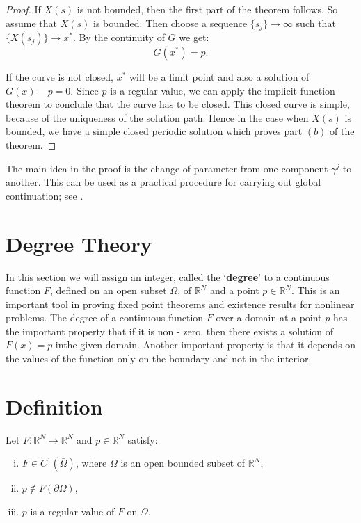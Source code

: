 \begin{proof}
If $X(s)$ is not bounded, then the first part of the theorem
follows. So assume that $X(s)$ is bounded. Then choose a sequence $\{
s_j \} \rightarrow \infty$ such that $\{ X(s_j) \} \rightarrow
x^*$. By the continuity of $G$ we get: 
$$
G(x^*) = p.
$$

If the curve is not closed, $x^*$ will be a limit point and also a
solution of $G(x)-p = 0$. Since $p$ is a regular value, we can apply
the implicit function theorem to conclude that the curve has to be
closed. This closed curve is simple, because of the uniqueness of the
solution path. Hence in the case when $X(s)$ is bounded, we have a
simple closed periodic solution which proves part $(b)$ of the
theorem. 
\end{proof}

\begin{remark*}
The main idea in the proof is the change of parameter from one
component $\gamma^j$ to another. This can be used as a practical
procedure for carrying out global continuation; see \cite{key27}. 
\end{remark*}


\section{Degree Theory}\label{chap3-sec3.7}%

In this section we will assign an integer, called the `\textbf{degree}' to a
continuous function $F$, defined on an open subset $\Omega$, of
$\mathbb{R}^N$ and a point $p \in \mathbb{R}^N$. This is an
important tool in proving fixed point theorems and existence results
for nonlinear problems. The degree of a continuous function $F$ over
a domain at a point $p$ has the important property that if it is non -
zero, then there exists a solution of $F(x) = p$ in\pageoriginale the given
domain. Another important property is that it depends on the values of
the function only on the boundary and not in the interior. 

\section{Definition}\label{chap3-sec3.8}%

Let $F : \mathbb{R}^N \rightarrow \mathbb{R}^N$ and $p  \in
\mathbb{R}^N$ satisfy: 
\begin{enumerate}[(i)]
\item $F \in C^1 (\bar{\Omega})$, where $\Omega$ is an open
  bounded subset of $\mathbb{R}^N$, 

\item $p \not\in F (\partial \Omega)$,

\item $p$ is a regular value of $F$ on $\Omega$. 
\end{enumerate}

